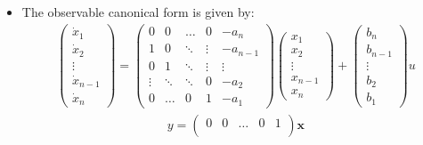 \begin{itemize}
    \item The observable canonical form is given by:
    \begin{gather*}
    \begin{pmatrix}
    \dot{x}_{1}\\
    \dot{x}_{2}\\
    \vdots\\
    \dot{x}_{n-1}\\
    \dot{x}_{n}
    \end{pmatrix} =
    \begin{pmatrix}
    0 & 0 &  \ldots & 0& -a_{n}\\
    1 & 0 &  \ddots &  \vdots &  -a_{n-1}\\
    0 &1 &\ddots  & \vdots & \vdots \\
    \vdots & \ddots & \ddots & 0 & -a_{2}\\
    0 & \ldots & 0 & 1 & -a_{1}
    \end{pmatrix} 
    \begin{pmatrix}
    {x}_{1}\\
    {x}_{2}\\
    \vdots\\
    {x}_{n-1}\\
    {x}_{n}
    \end{pmatrix}
    +
    \begin{pmatrix}
    b_{n}\\
    b_{n-1}\\
    \vdots\\
    b_{2}\\
    b_{1}
    \end{pmatrix}u
    \end{gather*}
    \begin{gather*}
    y = \begin{pmatrix}
    0&0&\ldots&0&1\\
    \end{pmatrix}
    \mathbf{x}
    \end{gather*}


\end{itemize}

